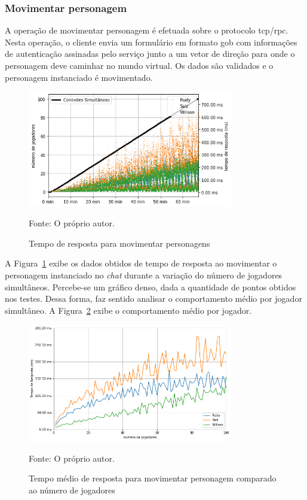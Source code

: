 \subsubsection{Movimentar personagem}

A operação de movimentar personagem é efetuada sobre o protocolo \ac{tcp}/\ac{rpc}.
%
Nesta operação, o cliente envia um formulário em formato \ac{gob} com informações de autenticação assinadas pelo serviço junto a um vetor de direção para onde o personagem deve caminhar no mundo virtual.
%
Os dados são validados e o personagem instanciado é movimentado.

\begin{figure}[htb!]
  \caption{Tempo de resposta para movimentar personagens}
  \label{fig:move_character_request_time}
  \includegraphics[width=0.8\textwidth]{figuras/analise/rt/move_character_request_time}
  \centering

  Fonte: O próprio autor.
\end{figure}

A Figura~\ref{fig:move_character_request_time} exibe os dados obtidos de tempo de resposta ao movimentar o personagem instanciado no \textit{chat} durante a variação do número de jogadores simultâneos.
%
Percebe-se um gráfico denso, dada a quantidade de pontos obtidos nos testes.
%
Dessa forma, faz sentido analisar o comportamento médio por jogador simultâneo.
%
A Figura~\ref{fig:spawn_character_request_time_per_concurrency} exibe o comportamento médio por jogador.

\begin{figure}[htb!]
  \caption{Tempo médio de resposta para movimentar personagem comparado ao número de jogadores}
  \label{fig:spawn_character_request_time_per_concurrency}
  \includegraphics[width=0.8\textwidth]{figuras/analise/rt/spawn_character_request_time_per_concurrency}
  \centering

  Fonte: O próprio autor.
\end{figure}

